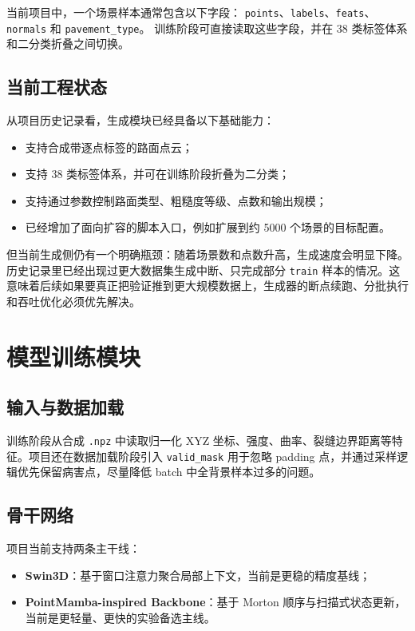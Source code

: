 \documentclass[12pt]{ctexart}
\begin{document}
当前项目中，一个场景样本通常包含以下字段：
\texttt{points}、\texttt{labels}、\texttt{feats}、\texttt{normals} 和 \texttt{pavement\_type}。
训练阶段可直接读取这些字段，并在 38 类标签体系和二分类折叠之间切换。

\subsection{当前工程状态}

从项目历史记录看，生成模块已经具备以下基础能力：

\begin{itemize}
  \item 支持合成带逐点标签的路面点云；
  \item 支持 38 类标签体系，并可在训练阶段折叠为二分类；
  \item 支持通过参数控制路面类型、粗糙度等级、点数和输出规模；
  \item 已经增加了面向扩容的脚本入口，例如扩展到约 5000 个场景的目标配置。
\end{itemize}

但当前生成侧仍有一个明确瓶颈：随着场景数和点数升高，生成速度会明显下降。历史记录里已经出现过更大数据集生成中断、只完成部分 \texttt{train} 样本的情况。这意味着后续如果要真正把验证推到更大规模数据上，生成器的断点续跑、分批执行和吞吐优化必须优先解决。

\section{模型训练模块}

\subsection{输入与数据加载}

训练阶段从合成 \texttt{.npz} 中读取归一化 XYZ 坐标、强度、曲率、裂缝边界距离等特征。项目还在数据加载阶段引入 \texttt{valid\_mask} 用于忽略 padding 点，并通过采样逻辑优先保留病害点，尽量降低 batch 中全背景样本过多的问题。

\subsection{骨干网络}

项目当前支持两条主干线：

\begin{itemize}
  \item \textbf{Swin3D}：基于窗口注意力聚合局部上下文，当前是更稳的精度基线；
  \item \textbf{PointMamba-inspired Backbone}：基于 Morton 顺序与扫描式状态更新，当前是更轻量、更快的实验备选主线。
\end{itemize}
\end{document}
